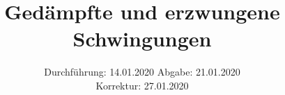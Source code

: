

\subject{Versuchsnummer: 354}
\title{Gedämpfte und erzwungene Schwingungen}
\date{%
  Durchführung: 14.01.2020
  \hspace{3em}
  Abgabe: 21.01.2020\\
  \hspace{15em}
  Korrektur: 27.01.2020 
}



\maketitle
\thispagestyle{empty}
\tableofcontents
\newpage




\newpage
\nocite{*}
\printbibliography



